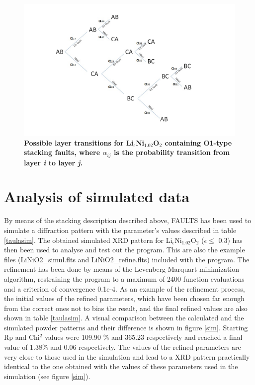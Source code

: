 \begin{figure}[t]
\begin{center}
\includegraphics [width=5.2 in]{transitions.jpg}
\caption{\bf Possible layer transitions for Li$_{\epsilon}$Ni$_{1.02}$O$_{2}$ containing O1-type stacking faults, where $\alpha_{ij}$ is the probability transition from layer \emph{i} to layer \emph{j}.}
\label{capes}
\end{center}
\end{figure}





\section{Analysis of simulated data}
\label{Analysis of simulated data}

By  means of the  stacking description described above, FAULTS has been used to simulate a diffraction pattern with the parameter's values described in table \ref{taulasim}.
The obtained simulated XRD pattern for Li$_{\epsilon}$Ni$_{1.02}$O$_{2}$ ($\epsilon\leq$ 0.3) has then been used to analyse and test out the program. This are also the example files (LiNiO2_simul.flts and LiNiO2_refine.flts) included with the program. The refinement has been done by means of the Levenberg Marquart minimization algorithm, restraining the program to a maximum of 2400 function evaluations and a criterion of convergence 0.1e-4. As an example of the refinement process, the initial values of the refined parameters, which have been chosen far enough from the correct ones not to bias the result,
and  the final refined values are also  shown in table \ref{taulasim}.
A visual comparison between the calculated and the simulated powder patterns and their difference is shown in figure \ref{sim}.
Starting Rp and Chi$^{2}$ values were 109.90 $\%$  and 365.23 respectively and reached a final value of 1.38$\%$ and 0.06 respectively.
The values of the refined parameters are very close to those used in the simulation and lead to a XRD pattern practically
identical to the one obtained with the values of these parameters used in the simulation (see figure \ref{sim}).



